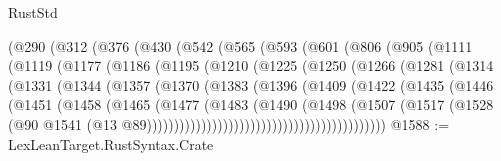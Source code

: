 \begin{lexlean}{RustStd}
\begin{coremodule}
      (@290
        (@312
          (@376
            (@430
              (@542
                (@565
                  (@593
                    (@601
                      (@806
                        (@905
                          (@1111
                            (@1119
                              (@1177
                                (@1186
                                  (@1195
                                    (@1210
                                      (@1225
                                        (@1250
                                          (@1266
                                            (@1281
                                              (@1314
                                                (@1331
                                                  (@1344
                                                    (@1357
                                                      (@1370
                                                        (@1383
                                                          (@1396
                                                            (@1409
                                                              (@1422
                                                                (@1435
                                                                  (@1446
                                                                    (@1451
                                                                      (@1458
                                                                        (@1465
                                                                          (@1477
                                                                            (@1483
                                                                              (@1490
                                                                                (@1498
                                                                                  (@1507
                                                                                    (@1517
                                                                                      (@1528
                                                                                        (@90
                                                                                          @1541
                                                                                          (@13
                                                                                            @89))))))))))))))))))))))))))))))))))))))))))))
@1588 := LexLeanTarget.RustSyntax.Crate

\end{coremodule}
\end{lexlean}
